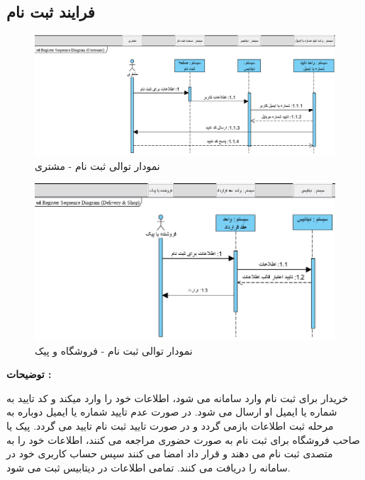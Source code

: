 \documentclass[12pt,a4paper]{article}
\begin{document}
	
	\subsection{فرایند ثبت نام} \label{section.sequence.register}
		\begin{figure}[h!]
			\begin{center}
				\includegraphics[width=12cm]{images/Register Sequence Diagram (Customer).png}
			\end{center}
			\caption{نمودار توالی ثبت نام - مشتری}
		\end{figure}
		
		\begin{figure}[h!]
			\begin{center}
				\includegraphics[width=12cm]{images/Register Sequence Diagram (Delivery & Shop).png}
			\end{center}
			\caption{نمودار توالی ثبت نام - فروشگاه و پیک}
		\end{figure}
		
		\textbf{توضیحات :} 
		
		
	خریدار برای ثبت نام وارد سامانه می شود، اطلاعات خود را وارد میکند و کد تایید به شماره یا ایمیل او ارسال می شود. در صورت عدم تایید شماره یا ایمیل دوباره به مرحله ثبت اطلاعات بازمی گردد و در صورت تایید ثبت نام تایید می گردد.	پیک یا صاحب فروشگاه برای ثبت نام به صورت حضوری مراجعه می کنند، اطلاعات خود را به متصدی ثبت نام می دهند و قرار داد امضا می کنند سپس حساب کاربری خود در سامانه را دریافت می کنند. تمامی اطلاعات در دیتابیس ثبت می شود.	
		\pagebreak
	
\end{document}
